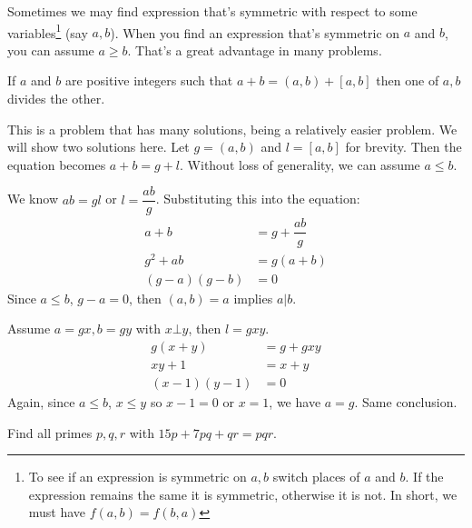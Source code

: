 \documentclass[problems.tex]{subfile}
\begin{document}
 Sometimes we may find expression that's symmetric with respect to some variables\footnote{To see if an expression is symmetric on $a,b$ switch places of $a$ and $b$. If the expression remains the same it is symmetric, otherwise it is not. In short, we must have $f(a,b)=f(b,a)$} (say $a,b$). When you find an expression that's symmetric on $a$ and $b$, you can assume $a\geq b$. That's a great advantage in many problems. 
	
	\begin{problem}[Russia, $2000$]
		If $a$ and $b$ are positive integers such that $a+b=(a,b)+[a,b]$ then one of $a,b$ divides the other.
	\end{problem}
This is a problem that has many solutions, being a relatively easier problem. We will show two solutions here. Let $g=(a,b)$ and $l=[a,b]$ for brevity. Then the equation becomes $a+b=g+l$. Without loss of generality, we can assume $a\leq b$.
	\begin{solution}[First]
		We know $ab=gl$ or $l=\dfrac{ab}{g}$. Substituting this into the equation:
			\begin{align*}
				a+b & = g+\dfrac{ab}{g}\\
				g^2+ab & = g(a+b)\\
				(g-a)(g-b) & = 0
			\end{align*}
		Since $a\leq b$, $g-a=0$, then $(a,b)=a$ implies $a|b$.
	\end{solution}
	
	\begin{solution}[Second]
		Assume $a=gx,b=gy$ with $x\bot y$, then $l=gxy$.
			\begin{align*}
				g(x+y) & = g+gxy\\
				xy+1 & = x+y\\
				(x-1)(y-1) & = 0
			\end{align*}
		Again, since $a\leq b$, $x\leq y$ so $x-1=0$ or $x=1$, we have $a=g$. Same conclusion.
	\end{solution}
	
	\begin{problem}[Slovenia $2010$]
		Find all primes $p,q,r$ with $15p+7pq+qr=pqr$.
	\end{problem}
	
\end{document}
